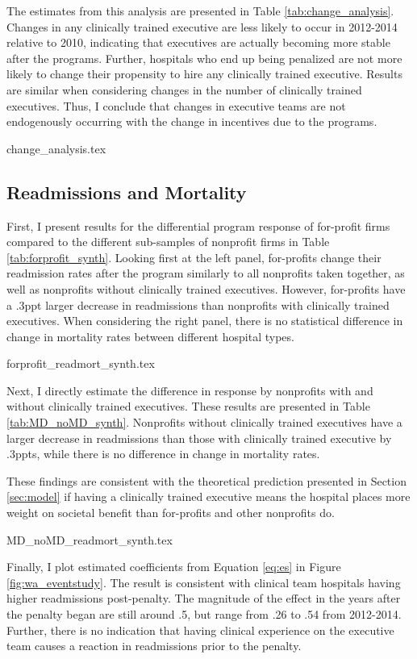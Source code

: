 \documentclass[12pt]{article}
\begin{document}
    The estimates from this analysis are presented in Table \ref{tab:change_analysis}. Changes in any clinically trained executive are less likely to occur in 2012-2014 relative to 2010, indicating that executives are actually becoming more stable after the programs. Further, hospitals who end up being penalized are not more likely to change their propensity to hire any clinically trained executive. Results are similar when considering changes in the number of clinically trained executives. Thus, I conclude that changes in executive teams are not endogenously occurring with the change in incentives due to the programs. 

     {change_analysis.tex}

     
     \subsection{Readmissions and Mortality}

     First, I present results for the differential program response of for-profit firms compared to the different sub-samples of nonprofit firms in Table \ref{tab:forprofit_synth}. Looking first at the left panel, for-profits change their readmission rates after the program similarly to all nonprofits taken together, as well as nonprofits without clinically trained executives. However, for-profits have a .3ppt larger decrease in readmissions than nonprofits with clinically trained executives. When considering the right panel, there is no statistical difference in change in mortality rates between different hospital types. 

     {forprofit_readmort_synth.tex}

     Next, I directly estimate the difference in response by nonprofits with and without clinically trained executives. These results are presented in Table \ref{tab:MD_noMD_synth}. Nonprofits without clinically trained executives have a larger decrease in readmissions than those with clinically trained executive by .3ppts, while there is no difference in change in mortality rates. 

     These findings are consistent with the theoretical prediction presented in Section \ref{sec:model} if having a clinically trained executive means the hospital places more weight on societal benefit than for-profits and other nonprofits do. 

     {MD_noMD_readmort_synth.tex}

    Finally, I plot estimated coefficients from Equation \ref{eq:es} in Figure \ref{fig:wa_eventstudy}. The result is consistent with clinical team hospitals having higher readmissions post-penalty. The magnitude of the effect in the years after the penalty began are still around .5, but range from .26 to .54 from 2012-2014. Further, there is no indication that having clinical experience on the executive team causes a reaction in readmissions prior to the penalty. 
\end{document}

